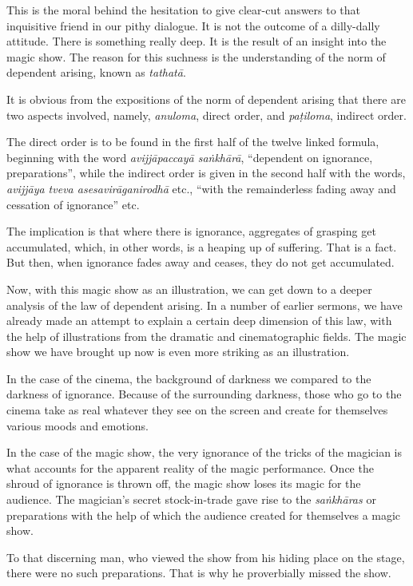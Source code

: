 This is the moral behind the hesitation to give clear-cut answers to that inquisitive friend in our pithy dialogue. It is not the outcome of a dilly-dally attitude. There is something really deep. It is the result of an insight into the magic show. The reason for this suchness is the understanding of the norm of dependent arising, known as \emph{tathatā}.

It is obvious from the expositions of the norm of dependent arising that there are two aspects involved, namely, \emph{anuloma}, direct order, and \emph{paṭiloma}, indirect order.

The direct order is to be found in the first half of the twelve linked formula, beginning with the word \emph{avijjāpaccayā saṅkhārā}, ``dependent on ignorance, preparations'', while the indirect order is given in the second half with the words, \emph{avijjāya tveva asesavirāganirodhā} etc., ``with the remainderless fading away and cessation of ignorance'' etc.

The implication is that where there is ignorance, aggregates of grasping get accumulated, which, in other words, is a heaping up of suffering. That is a fact. But then, when ignorance fades away and ceases, they do not get accumulated.

Now, with this magic show as an illustration, we can get down to a deeper analysis of the law of dependent arising. In a number of earlier sermons, we have already made an attempt to explain a certain deep dimension of this law, with the help of illustrations from the dramatic and cinematographic fields. The magic show we have brought up now is even more striking as an illustration.

In the case of the cinema, the background of darkness we compared to the darkness of ignorance. Because of the surrounding darkness, those who go to the cinema take as real whatever they see on the screen and create for themselves various moods and emotions.

In the case of the magic show, the very ignorance of the tricks of the magician is what accounts for the apparent reality of the magic performance. Once the shroud of ignorance is thrown off, the magic show loses its magic for the audience. The magician's secret stock-in-trade gave rise to the \emph{saṅkhāras} or preparations with the help of which the audience created for themselves a magic show.

To that discerning man, who viewed the show from his hiding place on the stage, there were no such preparations. That is why he proverbially missed the show.

